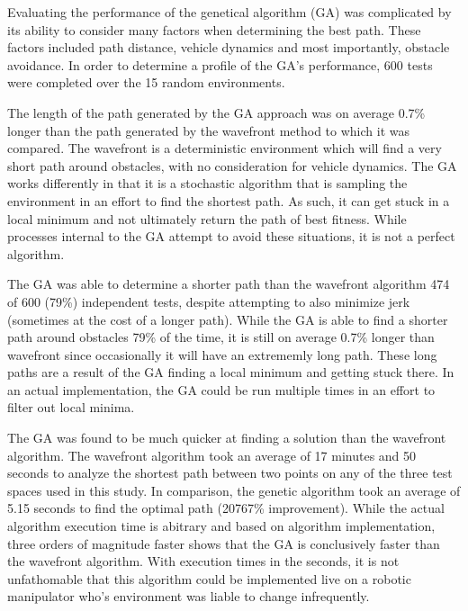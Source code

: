 	

Evaluating the performance of the genetical algorithm (GA) was complicated by its ability to consider many factors when determining the best path. These factors included path distance, vehicle dynamics and most importantly, obstacle avoidance. In order to determine a profile of the GA's performance, 600 tests were completed over the 15 random environments.

The length of the path generated by the GA approach was on average 0.7\% longer than the path generated by the wavefront method to which it was compared. The wavefront is a deterministic environment which will find a very short path around obstacles, with no consideration for vehicle dynamics. The GA works differently in that it is a stochastic algorithm that is sampling the environment in an effort to find the shortest path. As such, it can get stuck in a local minimum and not ultimately return the path of best fitness. While processes internal to the GA attempt to avoid these situations, it is not a perfect algorithm.

The GA was able to determine a shorter path than the wavefront algorithm 474 of 600 (79\%) independent tests, despite attempting to also minimize jerk (sometimes at the cost of a longer path). While the GA is able to find a shorter path around obstacles 79\% of the time, it is still on average 0.7\% longer than wavefront since occasionally it will have an extrememly long path. These long paths are a result of the GA finding a local minimum and getting stuck there. In an actual implementation, the GA could be run multiple times in an effort to filter out local minima.

The GA was found to be much quicker at finding a solution than the wavefront algorithm. The wavefront algorithm took an average of 17 minutes and 50 seconds to analyze the shortest path between two points on any of the three test spaces used in this study. In comparison, the genetic algorithm took an average of 5.15 seconds to find the optimal path (20767\% improvement). While the actual algorithm execution time is abitrary and based on algorithm implementation, three orders of magnitude faster shows that the GA is conclusively faster than the wavefront algorithm. With execution times in the seconds, it is not unfathomable that this algorithm could be implemented live on a robotic manipulator who's environment was liable to change infrequently.

